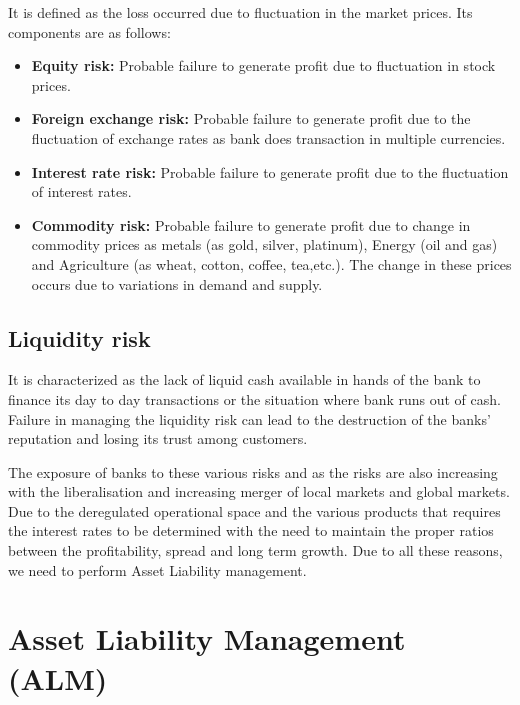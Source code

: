 		It is defined as the loss occurred due to fluctuation in the market prices. Its components are as follows:
		
		\begin{itemize}
		
			\item \textbf{Equity risk: }Probable failure to generate profit due to fluctuation in stock prices.
			
			\item \textbf{Foreign exchange risk: }Probable failure to generate profit due to the fluctuation of exchange rates as bank does transaction in multiple currencies.
			
			\item \textbf{Interest rate risk: }Probable failure to generate profit due to the fluctuation of interest rates.
			
			\item \textbf{Commodity risk: }Probable failure to generate profit due to change in commodity prices as metals (as gold, silver, platinum), Energy (oil and gas) and Agriculture (as wheat, cotton, coffee, tea,etc.). The change in these prices occurs due to variations in demand and supply.

		\end{itemize}

	\subsection{Liquidity risk}

		It is characterized as the lack of liquid cash available in hands of the bank to finance its day to day transactions or the situation where bank runs out of cash. Failure in managing the liquidity risk can lead to the destruction of the banks' reputation and losing its trust among customers.

The exposure of banks to these various risks and as the risks are also increasing with the liberalisation and increasing merger of local markets and global markets. Due to the deregulated operational space and the various products that requires the interest rates to be determined with the need to maintain the proper ratios between the profitability, spread and long term growth. Due to all these reasons, we need to perform Asset Liability management.


	
\section{Asset Liability Management (ALM)}

